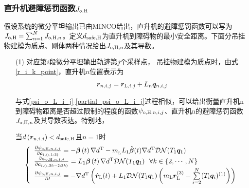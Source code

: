 \subsubsection{直升机避障惩罚函数$J_{\rm{o,H}}$}
假设系统的微分平坦输出已由MINCO给出，直升机的避障惩罚函数可以写为$J_{\rm{o,H}}=\sum\nolimits_{n=1}^N J_{{\rm{o,H}},n}$。定义$d_{\rm{safe, H}}$为直升机到障碍物的最小安全距离。下面分吊挂物建模为质点、刚体两种情况给出$J_{{\rm{o,H}},n}$及其导数。
\begin{enumerate}
    \item [(1)] 对应第$i$段微分平坦输出轨迹第$j$个采样点，
    吊挂物建模为质点时，由式\ref{r_i_k_point}，直升机$n$位置表示为
    \begin{equation}
        \boldsymbol{r}_{n,i,j} = \boldsymbol{r}_{{\rm{L}},i,j} + L_n \boldsymbol{q}_{n,i,j} 
    \end{equation}
    
    与式\ref{psi_o_L_i_j}-\ref{partial_psi_o_L_i_j}过程相似，可以给出衡量直升机n到障碍物距离是否超过限制的程度的函数$\psi_{{\rm{o,H}},n,i,j}$、直升机n的避障惩罚函数$J_{{\rm{o,H}},n}$及其导数表达。特别地，
    
    当$d\left({\boldsymbol{r}}_{n,i,j}\right) < d_{\rm{safe, H}}$且$n=1$时
    \begin{equation}
        \left\{\begin{array}{l}
            \frac{\partial \psi_{{\rm{o,H}},n,i,j}}{\partial \boldsymbol{c}_{i,(:,1:3)}} = -\boldsymbol{\beta}\left(t\right)\nabla d^{\rm{T}} - m_{\rm{_L}}L_1 \ddot{\boldsymbol{\beta}}(t) \nabla d^{\rm{T}} \mathcal{DN}(T_1\boldsymbol{q}_1)\\
            \frac{\partial \psi_{{\rm{o,H}},n,i,j}}{\partial \boldsymbol{c}_{i,(:,3k-2:3k)}} = L_1\boldsymbol{\beta}\left(t\right) \nabla d^{\rm{T}}\mathcal{DN}(T_1\boldsymbol{q}_1) \,\,\,\, \forall k \in \left\{ 2, \cdots, N \right\}\\
            \frac{\partial \psi_{{\rm{o,H}},n,i,j}}{\partial t} = -\nabla d^{\rm{T}} \left(
                \dot{\boldsymbol{r}}_{\rm{L}}(t) + L_1\mathcal{DN}(T_1\boldsymbol{q}_1)\left(
                    m_{\rm{L}}\boldsymbol{r}_{\rm{L}}^{(3)}
                    -\sum\limits_{i=2}^N (T_i\boldsymbol{q}_i)^{(1)}
                \right) 
            \right) 
        \end{array}
        \right.
    \end{equation}


\end{enumerate}
